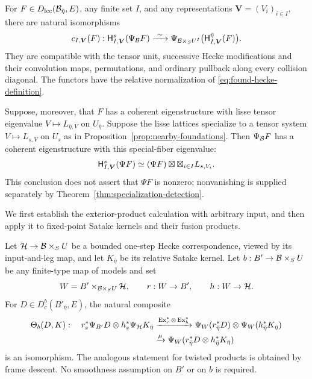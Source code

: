 \begin{proposition}\label{prop:hecke-specialization}
For $F\in D_{\mathrm{lcc}}(\mathcal B_{\bar\eta},E)$, any finite set $I$, and
any representations $\boldsymbol V=(V_i)_{i\in I}$, there are natural
isomorphisms
\begin{equation}\label{eq:spec-hecke-comparison}
 c_{I,\boldsymbol V}(F):
 \mathsf H^s_{I,\boldsymbol V}(\Psi_{\mathcal B}F)
       \xrightarrow{\ \sim\ }
 \Psi_{\mathcal B\times_S U^I}
                      \bigl(\mathsf H^{\bar\eta}_{I,\boldsymbol V}(F)\bigr).
\end{equation}
They are compatible with the tensor unit, successive Hecke
modifications and their convolution maps, permutations, and ordinary
pullback along every collision diagonal.  The functors have the relative
normalization of \eqref{eq:found-hecke-definition}.

Suppose, moreover, that $F$ has a coherent eigenstructure with lisse tensor
eigenvalue $V\mapsto L_{\bar\eta,V}$ on $U_{\bar\eta}$.  Suppose the
lisse lattices specialize to a tensor system $V\mapsto L_{s,V}$ on $U_s$
as in Proposition~\ref{prop:nearby-foundations}.  Then $\Psi_{\mathcal B}F$ has
a coherent eigenstructure with this special-fiber eigenvalue:
\begin{equation}\label{eq:spec-eigenvalue}
 \mathsf H^s_{I,\boldsymbol V}(\Psi F)
       \simeq (\Psi F)\boxtimes
                         \boxtimes_{i\in I}L_{s,V_i}.
\end{equation}
This conclusion does not assert that $\Psi F$ is nonzero; nonvanishing
is supplied separately by Theorem~\ref{thm:specialization-detection}.
\end{proposition}

We first establish the exterior-product calculation with arbitrary input,
and then apply it to fixed-point Satake kernels and their fusion products.

\begin{lemma}
\label{lem:spec-frame}
Let $\mathcal H\to\mathcal B\times_S U$ be a bounded one-step Hecke correspondence,
viewed by its input-and-leg map, and let $K_{\bar\eta}$ be its relative
Satake kernel.  Let $b:B'\to\mathcal B\times_S U$ be any finite-type map of
models and set
\[
 W=B'\mathbin{\times}_{\mathcal B\times_S U}\mathcal H,
 \qquad r:W\to B',\qquad h:W\to\mathcal H.
\]
For $D\in D^b_c(B'_{\bar\eta},E)$, the natural composite
\begin{align}
 \Theta_b(D,K):\quad
 r_s^*\Psi_{B'}D\otimes h_s^*\Psi_{\mathcal H}K_{\bar\eta}
 &\xrightarrow{\operatorname{Ex}^*_r\otimes
                             \operatorname{Ex}^*_h}
 \Psi_W(r_{\bar\eta}^*D)\otimes
                      \Psi_W(h_{\bar\eta}^*K_{\bar\eta})\notag\\
 &\xrightarrow{\mu}
 \Psi_W(r_{\bar\eta}^*D\otimes
                            h_{\bar\eta}^*K_{\bar\eta})
                       \label{eq:spec-frame-map}
\end{align}
is an isomorphism.  The analogous statement for twisted products is
obtained by frame descent.  No smoothness assumption on $B'$ or on $b$
is required.
\end{lemma}

